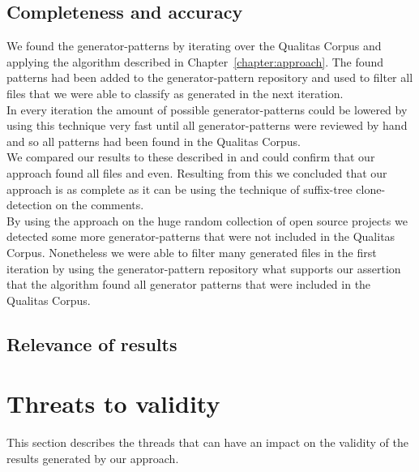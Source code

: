 \subsection{Completeness and accuracy}
We found the generator-patterns by iterating over the Qualitas Corpus and applying the algorithm described in Chapter~\ref{chapter:approach}. The found patterns had been added to the generator-pattern repository and used to filter all files that we were able to classify as generated in the next iteration.\\
In every iteration the amount of possible generator-patterns could be lowered by using this technique very fast until all generator-patterns were reviewed by hand and so all patterns had been found in the Qualitas Corpus.\\
We compared our results to these described in \cite{Bernwieser2014} and could confirm that our approach found all files and even. Resulting from this we concluded that our approach is as complete as it can be using the technique of suffix-tree clone-detection on the comments.\\
By using the approach on the huge random collection of open source projects we detected some more generator-patterns that were not included in the Qualitas Corpus. Nonetheless we were able to filter many generated files in the first iteration by using the generator-pattern repository what supports our assertion that the algorithm found all generator patterns that were included in the Qualitas Corpus.

\subsection{Relevance of results}


\section{Threats to validity}
This section describes the threads that can have an impact on the validity of the results generated by our approach.
